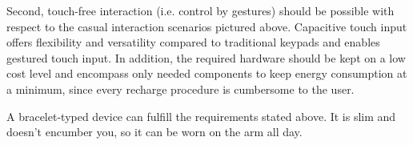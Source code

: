 Second, touch-free interaction (i.e. control by gestures) should be possible with respect to the casual interaction scenarios pictured above. Capacitive touch input offers flexibility and versatility compared to traditional keypads and enables gestured touch input. In addition, the required hardware should be kept on a low cost level and encompass only needed components to keep energy consumption at a minimum, since every recharge procedure is cumbersome to the user.

A bracelet-typed device can fulfill the requirements stated above. It is slim and doesn't encumber you, so it can be worn on the arm all day.